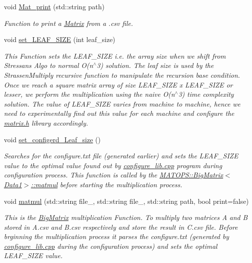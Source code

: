 \begin{DoxyCompactItemize}
\item 
void \hyperlink{classMATOPS_1_1BigMatrix_a2b3003374e008ff98f763c29aa4e3c07}{Mat\+\_\+print} (std\+::string path)
\begin{DoxyCompactList}\small\item\em Function to print a \hyperlink{classMATOPS_1_1Matrix}{Matrix} from a .csv file. \end{DoxyCompactList}\item 
void \hyperlink{classMATOPS_1_1BigMatrix_a654c6a62d3dec6a4728e56dd361adbf3}{set\+\_\+\+L\+E\+A\+F\+\_\+\+S\+I\+ZE} (int leaf\+\_\+size)
\begin{DoxyCompactList}\small\item\em This Function sets the L\+E\+A\+F\+\_\+\+S\+I\+ZE i.\+e. the array size when we shift from Stressan\textquotesingle{}s Algo to normal O(n$^\wedge$3) solution. The leaf size is used by the Strassen\+Multiply recursive function to manipulate the recursion base condition. Once we reach a square matrix array of size L\+E\+A\+F\+\_\+\+S\+I\+ZE x L\+E\+A\+F\+\_\+\+S\+I\+ZE or lesser, we perform the multiplication using the naive O(n$^\wedge$3) time complexity solution. The value of L\+E\+A\+F\+\_\+\+S\+I\+ZE varies from machine to machine, hence we need to experimentally find out this value for each machine and configure the \hyperlink{matrix_8h}{matrix.\+h} library accordingly. \end{DoxyCompactList}\item 
void \hyperlink{classMATOPS_1_1BigMatrix_a89f5328b2686ef2a0dfaa9c2bd852d37}{set\+\_\+configerd\+\_\+\+Leaf\+\_\+size} ()
\begin{DoxyCompactList}\small\item\em Searches for the configure.\+txt file (generated earlier) and sets the L\+E\+A\+F\+\_\+\+S\+I\+ZE value to the optimal value found out by \hyperlink{configure__lib_8cpp}{configure\+\_\+lib.\+cpp} program during configuration process. This function is called by the \hyperlink{classMATOPS_1_1BigMatrix_ac793236874a8ccfd66e21006011b9cff}{M\+A\+T\+O\+P\+S\+::\+Big\+Matrix$<$\+Data1$>$\+::matmul} before starting the multiplication process. \end{DoxyCompactList}\item 
void \hyperlink{classMATOPS_1_1BigMatrix_ac793236874a8ccfd66e21006011b9cff}{matmul} (std\+::string file\+\_, std\+::string file\+\_, std\+::string path, bool print=false)
\begin{DoxyCompactList}\small\item\em This is the \hyperlink{classMATOPS_1_1BigMatrix}{Big\+Matrix} multiplication Function. To multiply two matrices A and B stored in A.\+csv and B.\+csv respectively and store the result in C.\+csv file. Before brginning the multiplication process it parses the configure.\+txt (generated by \hyperlink{configure__lib_8cpp}{configure\+\_\+lib.\+cpp} during the configuration process) and sets the optimal L\+E\+A\+F\+\_\+\+S\+I\+ZE value. \end{DoxyCompactList}\item 

\end{DoxyCompactItemize}
